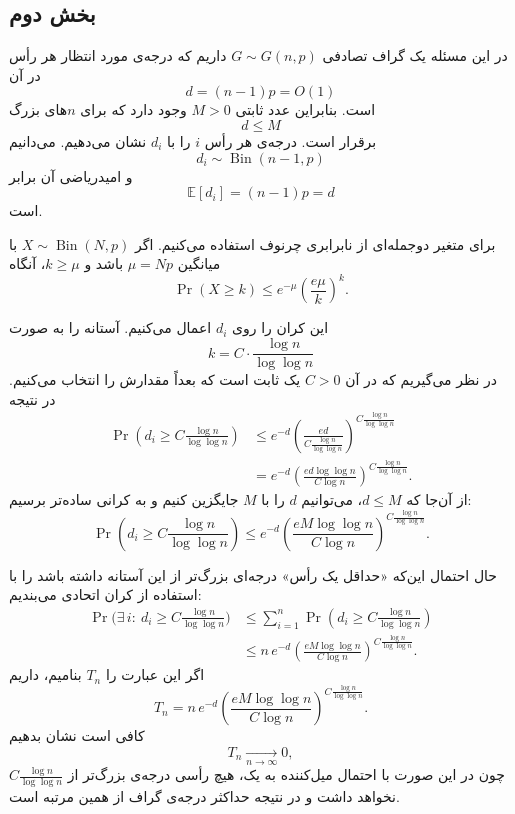 \subsection{بخش دوم}
در این مسئله یک گراف تصادفی
$G \sim G(n,p)$
داریم که درجه‌ی مورد انتظار هر رأس در آن
\[
d = (n-1)p = O(1)
\]
است. بنابراین عدد ثابتی $M>0$ وجود دارد که برای $n$های بزرگ
\[
d \le M
\]
برقرار است. درجه‌ی هر رأس $i$ را با $d_i$ نشان می‌دهیم. می‌دانیم
\[
d_i \sim \operatorname{Bin}(n-1,p)
\]
و امیدریاضی آن برابر
\[
\mathbb{E}[d_i] = (n-1)p = d
\]
است.

برای متغیر دوجمله‌ای از نابرابری چرنوف استفاده می‌کنیم. اگر
$X \sim \operatorname{Bin}(N,p)$
با میانگین $\mu = Np$ باشد و $k \ge \mu$، آنگاه
\[
\Pr(X \ge k) \le e^{-\mu} \left( \frac{e\mu}{k} \right)^k .
\]

این کران را روی $d_i$ اعمال می‌کنیم. آستانه را به صورت
\[
k = C \cdot \frac{\log n}{\log\log n}
\]
در نظر می‌گیریم که در آن $C>0$ یک ثابت است که بعداً مقدارش را انتخاب می‌کنیم. در نتیجه
\begin{align*}
\Pr\!\left(d_i \ge C \frac{\log n}{\log\log n}\right)
&\le e^{-d}
\left(
\frac{e d}{C \frac{\log n}{\log\log n}}
\right)^{C \frac{\log n}{\log\log n}} \\
&= e^{-d}
\left(
\frac{e d \log\log n}{C \log n}
\right)^{C \frac{\log n}{\log\log n}}.
\end{align*}
از آن‌جا که $d \le M$، می‌توانیم $d$ را با $M$ جایگزین کنیم و به کرانی ساده‌تر برسیم:
\[
\Pr\!\left(d_i \ge C \frac{\log n}{\log\log n}\right)
\le
e^{-d}
\left(
\frac{e M \log\log n}{C \log n}
\right)^{C \frac{\log n}{\log\log n}}.
\]

حال احتمال این‌که «حداقل یک رأس» درجه‌ای بزرگ‌تر از این آستانه داشته باشد را با استفاده از کران اتحادی  می‌بندیم:
\begin{align*}
\Pr\Big(\exists\, i:\ d_i \ge C \frac{\log n}{\log\log n}\Big)
&\le
\sum_{i=1}^n
\Pr\!\left(d_i \ge C \frac{\log n}{\log\log n}\right) \\
&\le
n \, e^{-d}
\left(
\frac{e M \log\log n}{C \log n}
\right)^{C \frac{\log n}{\log\log n}}.
\end{align*}
اگر این عبارت را $T_n$ بنامیم، داریم
\[
T_n =
n \, e^{-d}
\left(
\frac{e M \log\log n}{C \log n}
\right)^{C \frac{\log n}{\log\log n}}.
\]
کافی است نشان بدهیم
\[
T_n \xrightarrow[n\to\infty]{} 0,
\]
چون در این صورت با احتمال میل‌کننده به یک، هیچ رأسی درجه‌ی بزرگ‌تر از
$C \frac{\log n}{\log\log n}$
نخواهد داشت و در نتیجه حداکثر درجه‌ی گراف از همین مرتبه است.

